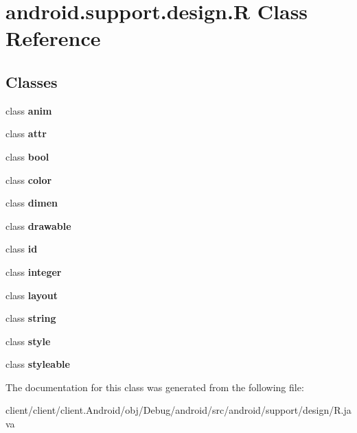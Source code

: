 \hypertarget{classandroid_1_1support_1_1design_1_1R}{}\section{android.\+support.\+design.\+R Class Reference}
\label{classandroid_1_1support_1_1design_1_1R}
\subsection*{Classes}
\begin{DoxyCompactItemize}
\item 
class {\bfseries anim}
\item 
class {\bfseries attr}
\item 
class {\bfseries bool}
\item 
class {\bfseries color}
\item 
class {\bfseries dimen}
\item 
class {\bfseries drawable}
\item 
class {\bfseries id}
\item 
class {\bfseries integer}
\item 
class {\bfseries layout}
\item 
class {\bfseries string}
\item 
class {\bfseries style}
\item 
class {\bfseries styleable}
\end{DoxyCompactItemize}


The documentation for this class was generated from the following file\+:\begin{DoxyCompactItemize}
\item 
client/client/client.\+Android/obj/\+Debug/android/src/android/support/design/R.\+java\end{DoxyCompactItemize}
